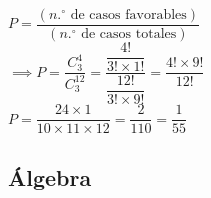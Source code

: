 \begin{enumerate}
	$P = \dfrac{(n.^\circ \text{ de casos favorables})}{(n.^\circ \text{ de casos totales})}$ \\
	$\implies P = \dfrac{C_{3}^{4}}{C_{3}^{12}} = \dfrac{\dfrac{4!}{3! \times 1!}}{\dfrac{12!}{3! \times 9!}} = \dfrac{4! \times 9!}{12!}$ \\
	
	$P = \dfrac{24 \times 1}{10 \times 11 \times 12} = \dfrac{2}{110} = \dfrac{1}{55}$
	
	\vspace{6mm}
\end{enumerate}		







\subsection*{Álgebra}

